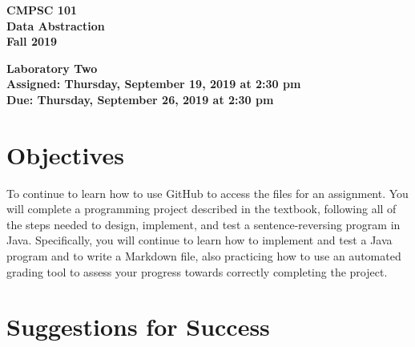 \documentclass[11pt]{article}
\newcommand{\assignmentduedate}{September 26}
\newcommand{\assignmentassignedate}{September 19}
\newcommand{\assignmentnumber}{Two}
\newcommand{\labyear}{2019}
\newcommand{\labday}{Thursday}
\newcommand{\labtime}{2:30 pm}
\newcommand{\assigneddate}{Assigned: \labday, \assignmentassignedate, \labyear{} at \labtime{}}
\newcommand{\duedate}{Due: \labday, \assignmentduedate, \labyear{} at \labtime{}}
\newcommand{\labtitle}[1]
{
  \begin{center}
    \begin{center}
      \bf
      CMPSC 101\\Data Abstraction\\
      Fall 2019\\
      \medskip
    \end{center}
    \bf
    #1
  \end{center}
}
\begin{document}
\thispagestyle{empty}

\labtitle{Laboratory \assignmentnumber{} \\ \assigneddate{} \\ \duedate{}}

\section*{Objectives}

To continue to learn how to use GitHub to access the files for an assignment.
You will complete a programming project described in the textbook, following all
of the steps needed to design, implement, and test a sentence-reversing program
in Java. Specifically, you will continue to learn how to implement and test a
Java program and to write a Markdown file, also practicing how to use an
automated grading tool to assess your progress towards correctly completing the
project.

\section*{Suggestions for Success}
\end{document}
